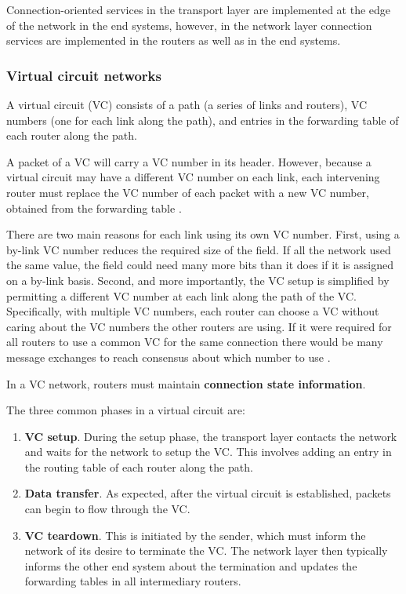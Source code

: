 \documentclass[12pt, oneside]{book}
\begin{document}
Connection-oriented services in the transport layer are implemented at the edge of the network in the end systems, however, in the network layer connection services are implemented in the routers as well as in the end systems.

\subsubsection{Virtual circuit networks}

A virtual circuit (VC) consists of a path (a series of links and routers), VC numbers (one for each link along the path), and entries in the forwarding table of each router along the path.

A packet of a VC will carry a VC number in its header. However, because a virtual circuit may have a different VC number on each link, each intervening router must replace the VC number of each packet with a new VC number, obtained from the forwarding table \cite[p.~314]{computer-networking-kurose-2012}.

There are two main reasons for each link using its own VC number. First, using a by-link VC number reduces the required size of the field. If all the network used the same value, the field could need many more bits than it does if it is assigned on a by-link basis. Second, and more importantly, the VC setup is simplified by permitting a different VC number at each link along the path of the VC. Specifically, with multiple VC numbers, each router can choose a VC without caring about the VC numbers the other routers are using. If it were required for all routers to use a common VC for the same connection there would be many message exchanges to reach consensus about which number to use \cite[p.~315]{computer-networking-kurose-2012}.

In a VC network, routers must maintain \textbf{connection state information}.

The three common phases in a virtual circuit are:
\begin{enumerate}
    \item \textbf{VC setup}. During the setup phase, the transport layer contacts the network and waits for the network to setup the VC. This involves adding an entry in the routing table of each router along the path.
    \item \textbf{Data transfer}. As expected, after the virtual circuit is established, packets can begin to flow through the VC.
    \item \textbf{VC teardown}. This is initiated by the sender, which must inform the network of its desire to terminate the VC. The network layer then typically informs the other end system about the termination and updates the forwarding tables in all intermediary routers.
\end{enumerate}
\end{document}
